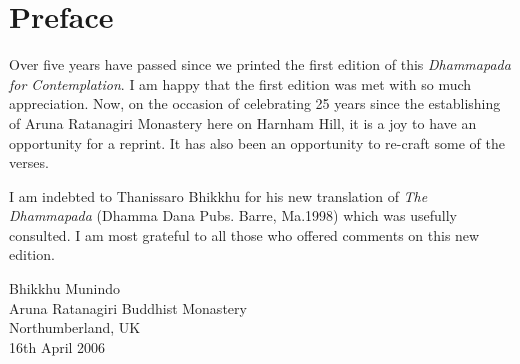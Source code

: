 
\chapter[Preface to the second edition (2006)]{Preface}

Over five years have passed since we printed the first edition of this \emph{Dhammapada for Contemplation}. I am happy that the first edition was met with so much appreciation. Now, on the occasion of celebrating 25 years since the establishing of Aruna Ratanagiri Monastery here on Harnham Hill, it is a joy to have an opportunity for a reprint. It has also been an opportunity to re-craft some of  the verses.

I am indebted to Thanissaro Bhikkhu for his new translation of \emph{The Dhammapada} (Dhamma Dana Pubs. Barre, Ma.1998) which was usefully consulted. I am most grateful to all those who offered comments on this new edition.

\bigskip

{\raggedleft
Bhikkhu Munindo\\
Aruna Ratanagiri Buddhist Monastery\\
Northumberland, UK\\
16th April 2006
\par}

